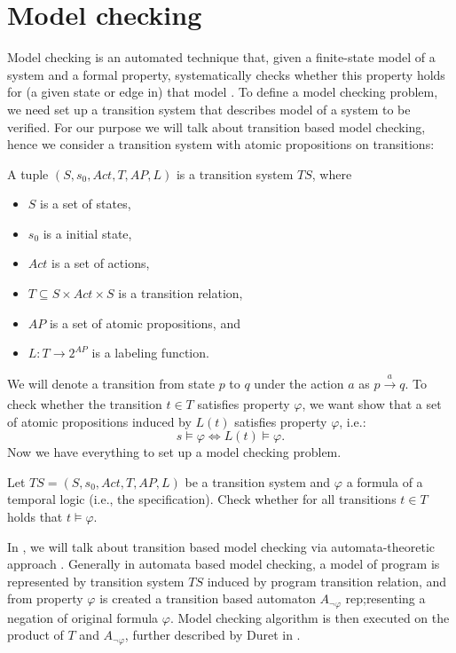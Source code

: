 \section{Model checking} \label{sec:mc}
Model checking is an automated technique that, given a finite-state model of a
system and a formal property, systematically checks whether this property holds
for (a given state or edge in) that model \cite{Baier08}. To define a model checking problem,
we need set up a transition system that describes model of a system to be
verified. For our purpose we will talk about transition based model checking,
hence we consider a transition system with atomic propositions on transitions:
\begin{definition}\label{def:ts}
A tuple $(S, s_0, Act, T, AP, L)$ is a transition system $TS$, where
\begin{itemize}
    \item $S$ is a set of states,
    \item $s_0$ is a initial state,
    \item $Act$ is a set of actions,
    \item $T \subseteq S \times Act \times S$ is a
    transition relation,
    \item $AP$ is a set of atomic propositions, and
    \item $L \colon T \rightarrow 2^{AP}$ is a labeling function.
\end{itemize}
\end{definition}
\noindent
We will denote a transition from state $p$ to $q$ under the action $a$ as $p \xrightarrow[]{a} q$.
To check whether the transition $t \in T$ satisfies property $\varphi$, we want show that a set of
atomic propositions induced by $L(t)$ satisfies property $\varphi$, i.e.:
$$ s \models \varphi \iff L(t) \models \varphi.$$
Now we have everything to set up a model checking problem.

\begin{definition}\label{def:mc}
Let $TS = (S, s_0, Act, T, AP, L)$ be a transition system and $\varphi$ a
formula of a temporal logic (i.e., the specification). Check whether for all
transitions $t \in T$ holds that $t \models \varphi$.
\end{definition}

In \DIVINE, we will talk about transition based model checking
via automata-theoretic approach \cite{Vardi96}. Generally in automata based model checking,
a model of program is represented by transition system $TS$ induced by program
transition relation, and from property $\varphi$ is created a transition based
automaton $A_{\neg \varphi}$ rep;resenting a negation of original formula
$\varphi$. Model checking algorithm is then executed on the product
of $T$ and $A_{\neg \varphi}$, further described by Duret in \cite{Duret04}.

